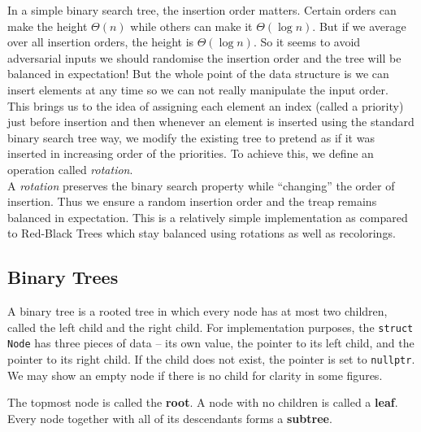 In a simple binary search tree, the insertion order matters. Certain orders can make the height $\Theta(n)$ 
while others can make it $\Theta(\log n)$. But if we average over all insertion orders, the height 
is $\Theta(\log n)$. So it seems to avoid adversarial inputs we should randomise the insertion order 
and the tree will be balanced in expectation! But the whole point of the data structure 
is we can insert elements at any time so we can not really manipulate the input order.\\


This brings us to the idea of assigning each element an index (called a priority) just before insertion and 
then whenever an element is inserted using the standard binary search tree way, we 
modify the existing tree to pretend as if it was inserted in increasing order of the 
priorities. To achieve this, we define an operation called \emph{rotation}.\\


A \emph{rotation} preserves the binary search property while ``changing'' the order of insertion. Thus we ensure a random insertion order 
and the treap remains balanced in expectation. This is a relatively simple implementation as compared to 
Red-Black Trees which stay balanced using rotations as well as recolorings.

\subsection{Binary Trees}
A binary tree is a rooted tree in which every node has at most two children, 
called the left child and the right child. For implementation purposes, the \texttt{struct Node} has 
three pieces of data -- its own value, the pointer to its left child, and the pointer to its right child. 
If the child does not exist, the pointer is set to \texttt{nullptr}. We may show an empty node if there 
is no child for clarity in some figures.


The topmost node is called the \textbf{root}. A node with no children is called a \textbf{leaf}. 
Every node together with all of its descendants forms a \textbf{subtree}.

